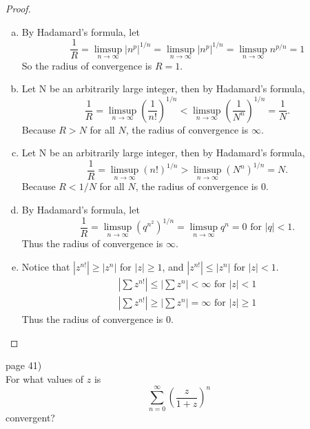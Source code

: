 \documentclass{article}
\newenvironment{problem}[2][Problem]{\begin{trivlist}
\item[\hskip \labelsep {\bfseries #1}\hskip \labelsep {\bfseries #2.}]}{\end{trivlist}}
\begin{document}
\begin{proof}
  \begin{enumerate}[(a)]
    \item By Hadamard's formula, let
      \[
        \frac{1}{R} = \limsup_{n \rightarrow \infty} |n^p|^{1/n}
        = \limsup_{n \rightarrow \infty} |n^p|^{1/n}
        = \limsup_{n \rightarrow \infty} n^{p/n}
        = 1
      \] So the radius of convergence is $R = 1$.

    \item Let N be an arbitrarily large integer, then by Hadamard's formula,\[
      \frac{1}{R} = \limsup_{n \rightarrow \infty} \left(\frac{1}{n!}\right)^{1/n}
      < \limsup_{n \rightarrow \infty} \left(\frac{1}{N^n}\right)^{1/n}
      = \frac{1}{N}.
    \] Because $R > N$ for all $N$, the radius of convergence is $\infty$.

    \item Let N be an arbitrarily large integer, then by Hadamard's formula,\[
      \frac{1}{R} = \limsup_{n \rightarrow \infty} (n!)^{1/n}
      > \limsup_{n \rightarrow \infty} (N^n)^{1/n}
      = N.
    \] Because $R < 1/N$ for all $N$, the radius of convergence is $0$.

    \item By Hadamard's formula, let \[
      \frac{1}{R} = \limsup_{n \rightarrow \infty} (q^{n^2})^{1/n}
      = \limsup_{n \rightarrow \infty} q^{n} = 0 \text { for } |q| < 1.
    \] Thus the radius of convergence is $\infty$.
    \item Notice that $|z^{n!}| \geq |z^n|$ for $|z| \geq 1$,
    and $|z^{n!}| \leq |z^n|$ for $|z| < 1$. \begin{align*}
      \left|\sum z^{n!}\right| \leq \left|\sum z^n\right| < \infty \text { for } |z| < 1 \\
      \left|\sum z^{n!}\right| \geq \left|\sum z^n\right| = \infty \text { for } |z| \geq 1
    \end{align*}
    Thus the radius of convergence is 0.
  \end{enumerate}
\end{proof}

\pagebreak

\begin{problem}{8} (page 41) \\
  For what values of $z$ is \[
    \sum_{n = 0}^\infty \left(
      \frac{z}{1 + z}
    \right)^n
  \] convergent?
\end{problem}
\end{document}
